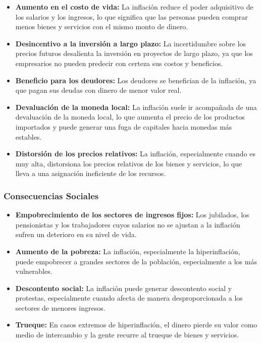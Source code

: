 \documentclass[
  stu,
  floatsintext,
  longtable,
  a4paper,
  nolmodern,
  notxfonts,
  notimes,
  12pt,
  colorlinks=true,linkcolor=blue,citecolor=blue,urlcolor=blue]{apa7}
\providecommand{\tightlist}{%
  \setlength{\itemsep}{0pt}\setlength{\parskip}{0pt}}
\begin{document}
\begin{itemize}
\tightlist
\item
  \textbf{Aumento en el costo de vida:} La inflación reduce el poder
  adquisitivo de los salarios y los ingresos, lo que significa que las
  personas pueden comprar menos bienes y servicios con el mismo monto de
  dinero.
\item
  \textbf{Desincentivo a la inversión a largo plazo:} La incertidumbre
  sobre los precios futuros desalienta la inversión en proyectos de
  largo plazo, ya que los empresarios no pueden predecir con certeza sus
  costos y beneficios.
\item
  \textbf{Beneficio para los deudores:} Los deudores se benefician de la
  inflación, ya que pagan sus deudas con dinero de menor valor real.
\item
  \textbf{Devaluación de la moneda local:} La inflación suele ir
  acompañada de una devaluación de la moneda local, lo que aumenta el
  precio de los productos importados y puede generar una fuga de
  capitales hacia monedas más estables.
\item
  \textbf{Distorsión de los precios relativos:} La inflación,
  especialmente cuando es muy alta, distorsiona los precios relativos de
  los bienes y servicios, lo que lleva a una asignación ineficiente de
  los recursos.
\end{itemize}

\subsubsection{Consecuencias Sociales}\label{consecuencias-sociales}

\begin{itemize}
\tightlist
\item
  \textbf{Empobrecimiento de los sectores de ingresos fijos:} Los
  jubilados, los pensionistas y los trabajadores cuyos salarios no se
  ajustan a la inflación sufren un deterioro en su nivel de vida.
\item
  \textbf{Aumento de la pobreza:} La inflación, especialmente la
  hiperinflación, puede empobrecer a grandes sectores de la población,
  especialmente a los más vulnerables.
\item
  \textbf{Descontento social:} La inflación puede generar descontento
  social y protestas, especialmente cuando afecta de manera
  desproporcionada a los sectores de menores ingresos.
\item
  \textbf{Trueque:} En casos extremos de hiperinflación, el dinero
  pierde su valor como medio de intercambio y la gente recurre al
  trueque de bienes y servicios.
\end{itemize}
\end{document}
